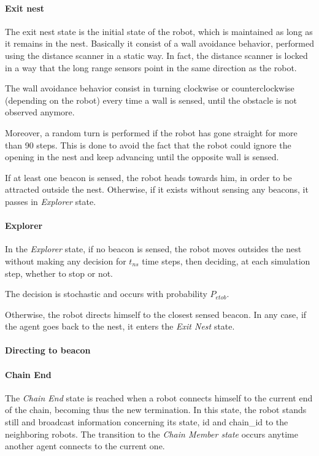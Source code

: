 \paragraph{Exit nest}
The exit nest state is the initial state of the robot, which is maintained as long as it remains in the nest.
Basically it consist of a wall avoidance behavior, performed using the distance scanner in a static way.
In fact, the distance scanner is locked in a way that the long range sensors point in the same direction as the robot.

The wall avoidance behavior consist in turning clockwise or counterclockwise (depending on the robot) every time a wall is sensed, until the obstacle is not observed anymore.

Moreover, a random turn is performed if the robot has gone straight for more than 90 steps.
This is done to avoid the fact that the robot could ignore the opening in the nest and keep advancing until the opposite wall is sensed.

If at least one beacon is sensed, the robot heads towards him, in order to be attracted outside the nest.
Otherwise, if it exists without sensing any beacons, it passes in \emph{Explorer} state.
\paragraph{Explorer}
In the \emph{Explorer} state, if no beacon is sensed, the robot moves outsides the nest without making any decision for $t_{ns}$ time steps, then deciding, at each simulation step, whether to stop or not.

The decision is stochastic and occurs with probability $P_{etob}$.

Otherwise, the robot directs himself to the closest sensed beacon.
In any case, if the agent goes back to the nest, it enters the \emph{Exit Nest} state.
\paragraph{Directing to beacon}

\paragraph{Chain End}
The \emph{Chain End} state is reached when a robot connects himself to the current end of the chain, becoming thus the new termination.
In this state, the robot stands still and broadcast information concerning its state, id and chain\_id to the neighboring robots.
The transition to the \emph{Chain Member state} occurs anytime another agent connects to the current one.

